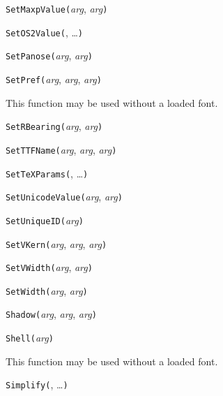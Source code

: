 \noindent\texttt{SetMaxpValue(}\textit{arg}, \textit{arg}\texttt{)}


\noindent\texttt{SetOS2Value(}, \ldots\texttt{)}


\noindent\texttt{SetPanose(}\textit{arg}, \textit{arg}\texttt{)}


\noindent\texttt{SetPref(}\textit{arg}, \textit{arg}, \textit{arg}\texttt{)}

This function may be used without a loaded font.


\noindent\texttt{SetRBearing(}\textit{arg}, \textit{arg}\texttt{)}


\noindent\texttt{SetTTFName(}\textit{arg}, \textit{arg}, \textit{arg}\texttt{)}


\noindent\texttt{SetTeXParams(}, \ldots\texttt{)}


\noindent\texttt{SetUnicodeValue(}\textit{arg}, \textit{arg}\texttt{)}


\noindent\texttt{SetUniqueID(}\textit{arg}\texttt{)}


\noindent\texttt{SetVKern(}\textit{arg}, \textit{arg}, \textit{arg}\texttt{)}


\noindent\texttt{SetVWidth(}\textit{arg}, \textit{arg}\texttt{)}


\noindent\texttt{SetWidth(}\textit{arg}, \textit{arg}\texttt{)}


\noindent\texttt{Shadow(}\textit{arg}, \textit{arg}, \textit{arg}\texttt{)}


\noindent\texttt{Shell(}\textit{arg}\texttt{)}

This function may be used without a loaded font.


\noindent\texttt{Simplify(}, \ldots\texttt{)}


